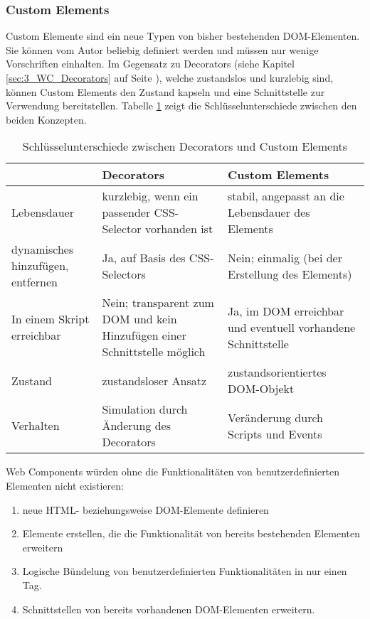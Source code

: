 \subsubsection{Custom Elements}
\label{sec:3_WC_Elements}

Custom Elemente sind ein neue Typen von bisher bestehenden DOM-Elementen. Sie können vom Autor beliebig definiert werden und müssen nur wenige Vorschriften einhalten. Im Gegensatz zu Decorators (siehe Kapitel \ref{sec:3_WC_Decorators} auf Seite \pageref{sec:3_WC_Decorators}), welche zustandslos und kurzlebig sind, können Custom Elements den Zustand kapseln und eine Schnittstelle zur Verwendung bereitstellen. Tabelle \ref{tab:Unterschiede} zeigt die Schlüsselunterschiede zwischen den beiden Konzepten.

\begin{table}[h]
\centering
\begin{tabular}{ p{3cm} || p{5cm} | p{5cm} }
& Decorators & Custom Elements \\
\hline
\hline
Lebensdauer & kurzlebig, wenn ein passender CSS-Selector vorhanden ist & stabil, angepasst an die Lebensdauer des Elements\\
\hline
dynamisches hinzufügen, entfernen & Ja, auf Basis des CSS-Selectors & Nein; einmalig (bei der Erstellung des Elements)\\
\hline
In einem Skript erreichbar& Nein; transparent zum DOM und kein Hinzufügen einer Schnittstelle möglich & Ja, im DOM erreichbar und eventuell vorhandene Schnittstelle\\
\hline
Zustand & zustandsloser Ansatz & zustandsorientiertes DOM-Objekt \\
\hline
Verhalten & Simulation durch Änderung des Decorators & Veränderung durch Scripts und Events \\
\end{tabular}
\caption[
Schlüsselunterschiede zwischen Decorators und Custom Elements
]
{Schlüsselunterschiede zwischen Decorators und Custom Elements}
\label{tab:Unterschiede}
\end{table}

Web Components würden ohne die Funktionalitäten von benutzerdefinierten Elementen nicht existieren:
\begin{enumerate}
\item neue HTML- beziehungsweise DOM-Elemente definieren
\item Elemente erstellen, die die Funktionalität von bereits bestehenden Elementen erweitern
\item Logische Bündelung von benutzerdefinierten Funktionalitäten in nur einen Tag.
\item Schnittstellen von bereits vorhandenen DOM-Elementen erweitern.
\end{enumerate}

